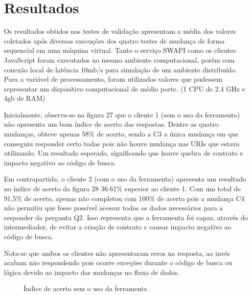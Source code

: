 \section{Resultados}

Os resultados obtidos nos testes de validação apresentam a média dos valores coletados após diversas execuções dos quatro testes de mudança de forma sequencial em uma máquina virtual. Tanto o serviço SWAPI como os clientes JavaScript foram executados no mesmo ambiente computacional, porém com conexão local de latência 10mb/s para simulação de um ambiente distribuído. Para a variável de processamento, foram utilizados valores que pudessem representar um dispositivo computacional de médio porte. (1 CPU de 2.4 GHz e 4gb de RAM)

Inicialmente, observa-se na figura 27 que o cliente 1 (sem o uso da ferramenta) não apresenta um bom índice de acerto das respostas. Dentre as quatro mudanças, obteve apenas 58\% de acerto, sendo a C3 a única mudança em que conseguiu responder certo todas pois não houve mudança nas URIs que estava utilizando. Um resultado esperado, significando que houve quebra de contrato e impacto negativo ao código de busca.

Em contrapartida, o cliente 2 (com o uso da ferramenta) apresenta um resultado no índice de acerto da figura 28 36.61\% superior ao cliente 1. Com um total de 91,5\% de acerto, apenas não completou com 100\% de acerto pois a mudança C4 não permitiu que fosse possível acessar todos os dados necessários para a responder da pergunta Q2. Isso representa que a ferramenta foi capaz, através do intermediador, de evitar a criação de contrato e causar impacto negativo ao código de busca.

Nota-se que ambos os clientes não apresentaram erros na resposta, ao invés acabam não respondendo pois ocorre exceções durante o código de busca ou lógica devido ao impacto das mudanças no fluxo de dados.

\begin{figure}[H]
  \centering
  \caption{Índice de acerto sem o uso da ferramenta}
\end{figure}

